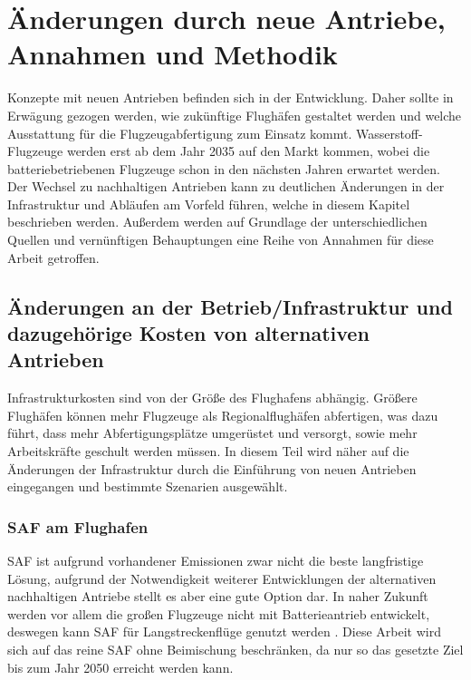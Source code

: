 \chapter{Änderungen durch neue Antriebe, Annahmen und Methodik}
\label{ch:Änderungen durch neue Antriebe, Annahmen und Methodik}

Konzepte mit neuen Antrieben befinden sich in der Entwicklung.
Daher sollte in Erwägung gezogen werden, wie zukünftige Flughäfen 
gestaltet werden und welche Ausstattung für 
die Flugzeugabfertigung zum Einsatz kommt.
Wasserstoff-Flugzeuge werden erst ab dem Jahr 2035 auf den Markt kommen, 
wobei die batteriebetriebenen Flugzeuge schon in den nächsten Jahren erwartet werden.
Der Wechsel zu nachhaltigen Antrieben kann zu deutlichen Änderungen 
in der Infrastruktur und Abläufen am Vorfeld führen, 
welche in diesem Kapitel beschrieben werden.
Außerdem werden auf Grundlage der unterschiedlichen Quellen und 
vernünftigen Behauptungen eine Reihe von Annahmen für diese Arbeit getroffen.
%

\section{Änderungen an der Betrieb/Infrastruktur und dazugehörige Kosten von alternativen Antrieben}
\label{s:Änderungen an der Abfertigung und dazugehörige Kosten von alternativen Antrieben}

Infrastrukturkosten sind von der Größe des Flughafens abhängig. 
Größere Flughäfen können mehr Flugzeuge als Regionalflughäfen abfertigen, 
was dazu führt, dass mehr Abfertigungsplätze umgerüstet und versorgt, 
sowie mehr Arbeitskräfte geschult werden müssen. 
In diesem Teil wird näher auf die Änderungen der Infrastruktur durch 
die Einführung von neuen Antrieben eingegangen und bestimmte Szenarien ausgewählt.

\subsection{SAF am Flughafen}
SAF ist aufgrund vorhandener Emissionen zwar nicht die beste langfristige Lösung, 
aufgrund der Notwendigkeit weiterer Entwicklungen der alternativen nachhaltigen 
Antriebe stellt es aber eine gute Option dar. 
In naher Zukunft werden vor allem die großen Flugzeuge nicht mit Batterieantrieb entwickelt, 
deswegen kann SAF für Langstreckenflüge genutzt werden \cite{dalmia2022powering}.
Diese Arbeit wird sich auf das reine SAF ohne Beimischung beschränken, 
da nur so das gesetzte Ziel bis zum Jahr 2050 erreicht werden kann.

